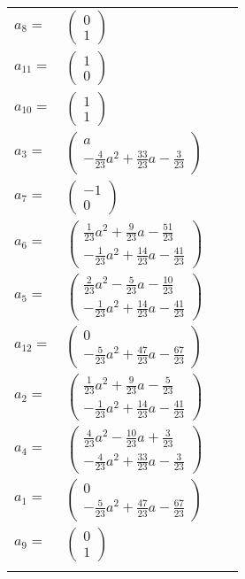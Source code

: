 \documentclass[1p]{elsarticle_modified}
\theoremstyle{definition}
\begin{document}
\begin{tabular}{m{7pt} m{180pt} m{7pt} m{180pt} }
\flushright $a_{8}=$&$\begin{pmatrix}0\\1\end{pmatrix}$ \\
\flushright $a_{11}=$&$\begin{pmatrix}1\\0\end{pmatrix}$ \\
\flushright $a_{10}=$&$\begin{pmatrix}1\\1\end{pmatrix}$ \\
\flushright $a_{3}=$&$\begin{pmatrix}a\\-\frac{4}{23} a^2+\frac{33}{23} a-\frac{3}{23}\end{pmatrix}$ \\
\flushright $a_{7}=$&$\begin{pmatrix}-1\\0\end{pmatrix}$ \\
\flushright $a_{6}=$&$\begin{pmatrix}\frac{1}{23} a^2+\frac{9}{23} a-\frac{51}{23}\\-\frac{1}{23} a^2+\frac{14}{23} a-\frac{41}{23}\end{pmatrix}$ \\
\flushright $a_{5}=$&$\begin{pmatrix}\frac{2}{23} a^2-\frac{5}{23} a-\frac{10}{23}\\-\frac{1}{23} a^2+\frac{14}{23} a-\frac{41}{23}\end{pmatrix}$ \\
\flushright $a_{12}=$&$\begin{pmatrix}0\\-\frac{5}{23} a^2+\frac{47}{23} a-\frac{67}{23}\end{pmatrix}$ \\
\flushright $a_{2}=$&$\begin{pmatrix}\frac{1}{23} a^2+\frac{9}{23} a-\frac{5}{23}\\-\frac{1}{23} a^2+\frac{14}{23} a-\frac{41}{23}\end{pmatrix}$ \\
\flushright $a_{4}=$&$\begin{pmatrix}\frac{4}{23} a^2-\frac{10}{23} a+\frac{3}{23}\\-\frac{4}{23} a^2+\frac{33}{23} a-\frac{3}{23}\end{pmatrix}$ \\
\flushright $a_{1}=$&$\begin{pmatrix}0\\-\frac{5}{23} a^2+\frac{47}{23} a-\frac{67}{23}\end{pmatrix}$ \\
\flushright $a_{9}=$&$\begin{pmatrix}0\\1\end{pmatrix}$\\&\end{tabular}
\end{document}

